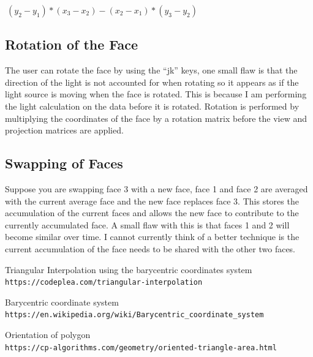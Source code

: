 \documentclass{article}
\begin{document}
$\ (y_2 - y_1) * (x_3 - x_2) - (x_2 - x_1) * (y_3 - y_2) $

\subsection{Rotation of the Face}

The user can rotate the face by using the ``jk'' keys, one small flaw is that the direction of the light is not accounted for when rotating so it appears as if the light source is moving when the face is rotated. This is because I am performing the light calculation on the data before it is rotated. Rotation is performed by multiplying the coordinates of the face by a rotation matrix before the view and projection matrices are applied. 

\subsection{Swapping of Faces}

Suppose you are swapping face 3 with a new face, face 1 and face 2 are averaged with the current average face and the new face replaces face 3. This stores the accumulation of the current faces and allows the new face to contribute to the currently accumulated face. A small flaw with this is that faces 1 and 2 will become similar over time. I cannot currently think of a better technique is the current accumulation of the face needs to be shared with the other two faces. 

\begin{thebibliography}{5}
  
  Triangular Interpolation using the barycentric coordinates system
  \\\texttt{https://codeplea.com/triangular-interpolation}

  Barycentric coordinate system
  \\\texttt{https://en.wikipedia.org/wiki/Barycentric\_coordinate\_system}

  Orientation of polygon
  \\\texttt{https://cp-algorithms.com/geometry/oriented-triangle-area.html}

  
\end{thebibliography}
\end{document}
